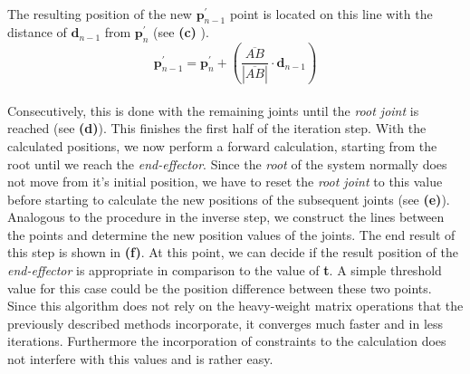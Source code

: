 \\The resulting position of the new $\textbf{p}_{n-1}^{'}$ point is located on this line with the distance of $\textbf{d}_{n-1}$ from $\textbf{p}_{n}^{'}$ (see \textbf{(c)} ).\\
\begin{equation}
\textbf{p}_{n-1}^{'}= \textbf{p}_{n}^{'}+ \left(\frac{\overline{AB}}{|\overline{AB}|}\cdot\textbf{d}_{n-1}\right)
\end{equation}
\\Consecutively, this is done with the remaining joints until the \textit{root joint} is reached (see \textbf{(d)}).
This finishes the first half of the iteration step. With the calculated positions, we now perform a forward calculation, starting from the root until we reach the \textit{end-effector}. Since the \textit{root} of the system normally does not move from it's initial position, we have to reset the \textit{root joint} to this value before starting to calculate the new positions of the subsequent joints (see\textbf{ (e)}).
\\
Analogous to the procedure in the inverse step, we construct the lines between the points and determine the new position values of the joints. The end result of this step is shown in \textbf{(f)}. At this point, we can decide if the result position of the \textit{end-effector} is appropriate in comparison to the value of \textbf{t}. A simple threshold value for this case could be the position difference between these two points.
\\Since this algorithm does not rely on the heavy-weight matrix operations that the previously described methods incorporate, it converges much faster and in less iterations. Furthermore the incorporation of constraints to the calculation does not interfere with this values and is rather easy.